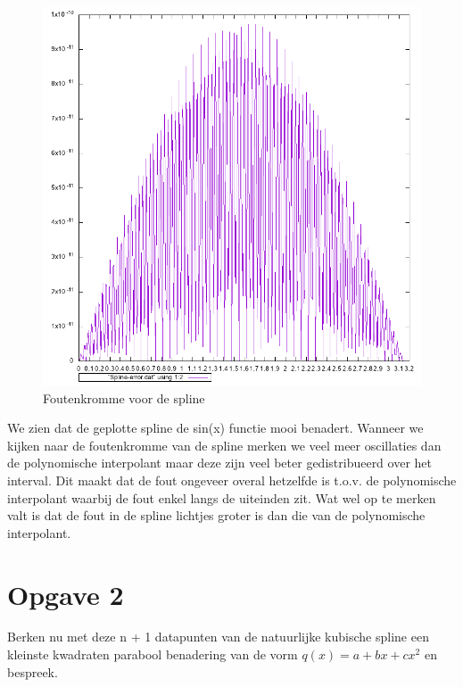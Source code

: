 \documentclass[10pt,a4paper]{article}
\begin{document}
\begin{figure}[H]
\centering
\includegraphics[scale= 0.42]{../Onegraphs/Spline-Error.png}
\caption{Foutenkromme voor de spline}
\end{figure}
We zien dat de geplotte spline de sin(x) functie mooi benadert. Wanneer we kijken naar de foutenkromme van de spline merken we veel meer oscillaties dan de polynomische interpolant maar deze zijn veel beter gedistribueerd over het interval. Dit maakt dat de fout ongeveer overal hetzelfde is t.o.v. de polynomische interpolant waarbij de fout enkel langs de uiteinden zit. Wat wel op te merken valt is dat de fout in de spline lichtjes groter is dan die van de polynomische interpolant.

\section{Opgave 2}
Berken nu met deze n + 1 datapunten van de natuurlijke kubische spline een kleinste kwadraten parabool benadering van de vorm $q(x) = a+bx+cx^{2}$ en bespreek.
\end{document}
